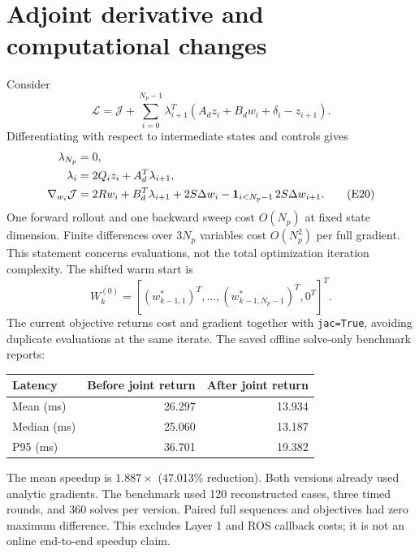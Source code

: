 \documentclass[11pt,a4paper]{article}
\begin{document}
\section{Adjoint derivative and computational changes}
Consider
\[
\mathcal L=\mathcal J+\sum_{i=0}^{N_p-1}\lambda_{i+1}^T
(A_dz_i+B_dw_i+\delta_i-z_{i+1}).
\]
Differentiating with respect to intermediate states and controls gives
\begin{align}
\lambda_{N_p}&=0,\notag\\
\lambda_i&=2Q_i z_i+A_d^T\lambda_{i+1},\notag\\
\nabla_{w_i}\mathcal J&=2Rw_i+B_d^T\lambda_{i+1}+2S\Delta w_i
-\mathbf1_{i<N_p-1}\,2S\Delta w_{i+1}.\tag{E20}
\end{align}
One forward rollout and one backward sweep cost $O(N_p)$ at fixed state
dimension. Finite differences over $3N_p$ variables cost $O(N_p^2)$ per full
gradient. This statement concerns evaluations, not the total optimization
iteration complexity. The shifted warm start is
\begin{equation}
W_k^{(0)}=[(w_{k-1,1}^*)^T,\ldots,(w_{k-1,N_p-1}^*)^T,0^T]^T.\tag{E21}
\end{equation}
The current objective returns cost and gradient together with
\texttt{jac=True}, avoiding duplicate evaluations at the same iterate.
The saved offline solve-only benchmark reports:
\begin{center}
\begin{tabular}{lrr}
\hline
Latency & Before joint return & After joint return\\\hline
Mean (ms)&26.297&13.934\\
Median (ms)&25.060&13.187\\
P95 (ms)&36.701&19.382\\\hline
\end{tabular}
\end{center}
The mean speedup is $1.887\times$ (47.013\% reduction). Both versions already
used analytic gradients. The benchmark used 120 reconstructed cases, three
timed rounds, and 360 solves per version. Paired full sequences and objectives
had zero maximum difference. This excludes Layer 1 and ROS callback costs;
it is not an online end-to-end speedup claim.
\end{document}
